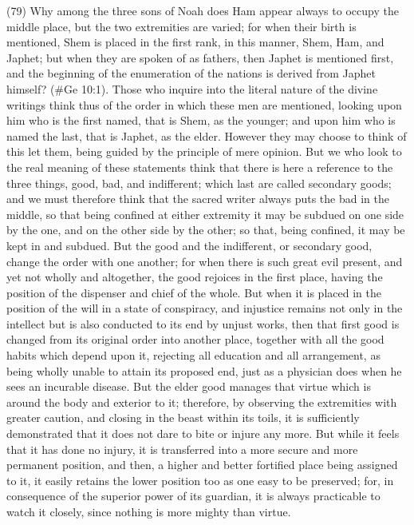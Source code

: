 (79) Why among the three sons of Noah does Ham appear always to occupy the middle place, but
the two extremities are varied; for when their birth is mentioned, Shem is placed in the first rank, in
this manner, Shem, Ham, and Japhet; but when they are spoken of as fathers, then Japhet is
mentioned first, and the beginning of the enumeration of the nations is derived from Japhet
himself? (\#Ge 10:1). Those who inquire into the literal nature of the divine writings think thus of
the order in which these men are mentioned, looking upon him who is the first named, that is Shem,
as the younger; and upon him who is named the last, that is Japhet, as the elder. However they
may choose to think of this let them, being guided by the principle of mere opinion. But we who look
to the real meaning of these statements think that there is here a reference to the three things,
good, bad, and indifferent; which last are called secondary goods; and we must therefore think that
the sacred writer always puts the bad in the middle, so that being confined at either extremity it may
be subdued on one side by the one, and on the other side by the other; so that, being confined, it
may be kept in and subdued. But the good and the indifferent, or secondary good, change the
order with one another; for when there is such great evil present, and yet not wholly and altogether,
the good rejoices in the first place, having the position of the dispenser and chief of the whole. But
when it is placed in the position of the will in a state of conspiracy, and injustice remains not only in
the intellect but is also conducted to its end by unjust works, then that first good is changed from its
original order into another place, together with all the good habits which depend upon it, rejecting all
education and all arrangement, as being wholly unable to attain its proposed end, just as a
physician does when he sees an incurable disease. But the elder good manages that virtue which
is around the body and exterior to it; therefore, by observing the extremities with greater caution,
and closing in the beast within its toils, it is sufficiently demonstrated that it does not dare to bite or
injure any more. But while it feels that it has done no injury, it is transferred into a more secure and
more permanent position, and then, a higher and better fortified place being assigned to it, it easily
retains the lower position too as one easy to be preserved; for, in consequence of the superior
power of its guardian, it is always practicable to watch it closely, since nothing is more mighty than
virtue.

